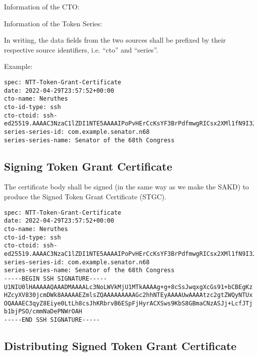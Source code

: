 \documentclass[a4paper,10pt]{article}
\begin{document}
Information of the CTO:

\begin{compactitem}
	\item {}
	\item {}
	\item {}
\end{compactitem}

Information of the Token Series:

\begin{compactitem}
	\item {}
	\item {}
\end{compactitem}

In writing, the data fields from the two sources shall be prefixed by their respective source identifiers, i.e. ``cto'' and ``series''.

Example:

\begin{lstlisting}
spec: NTT-Token-Grant-Certificate
date: 2022-04-29T23:57:52+00:00
cto-name: Neruthes
cto-id-type: ssh
cto-ctoid: ssh-ed25519.AAAAC3NzaC1lZDI1NTE5AAAAIPoPvHErCcKsYF3BrPdfmwgRICsx2XMl1fN9I3Jg1pPA
series-series-id: com.example.senator.n68
series-series-name: Senator of the 68th Congress
\end{lstlisting}


\subsection{Signing Token Grant Certificate}

The certificate body shall be signed (in the same way as we make the SAKD) to produce the Signed Token Grant Certificate (STGC).

\begin{lstlisting}
spec: NTT-Token-Grant-Certificate
date: 2022-04-29T23:57:52+00:00
cto-name: Neruthes
cto-id-type: ssh
cto-ctoid: ssh-ed25519.AAAAC3NzaC1lZDI1NTE5AAAAIPoPvHErCcKsYF3BrPdfmwgRICsx2XMl1fN9I3Jg1pPA
series-series-id: com.example.senator.n68
series-series-name: Senator of the 68th Congress
-----BEGIN SSH SIGNATURE-----
U1NIU0lHAAAAAQAAADMAAAALc3NoLWVkMjU1MTkAAAAg+g+8cSsJwqxgXcGs91+bCBEgKz
HZcyXV830jcmDWk8AAAAAEZmlsZQAAAAAAAAAGc2hhNTEyAAAAUwAAAAtzc2gtZWQyNTUx
OQAAAEC3qyZ8Eiye0LtLh8csJhKRbrvB6ESpFjHyrACXSws9KbS8GBmaCNzASJj+LcfJTj
b1bjPSO/cmmNaDePNWrOAH
-----END SSH SIGNATURE-----
\end{lstlisting}


\subsection{Distributing Signed Token Grant Certificate}
\end{document}
